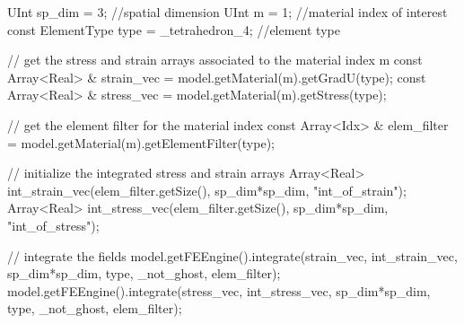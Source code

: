 \begin{cpp}
UInt sp_dim = 3; //spatial dimension
UInt m = 1; //material index of interest
const ElementType type = _tetrahedron_4; //element type

// get the stress and strain arrays associated to the material index m
const Array<Real> & strain_vec = model.getMaterial(m).getGradU(type);
const Array<Real> & stress_vec = model.getMaterial(m).getStress(type);

// get the element filter for the material index
const Array<Idx> & elem_filter = model.getMaterial(m).getElementFilter(type);

// initialize the integrated stress and strain arrays
Array<Real> int_strain_vec(elem_filter.getSize(), 
                           sp_dim*sp_dim, "int_of_strain");
Array<Real> int_stress_vec(elem_filter.getSize(), 
                           sp_dim*sp_dim, "int_of_stress");

// integrate the fields      
model.getFEEngine().integrate(strain_vec, int_strain_vec, 
                              sp_dim*sp_dim, type, _not_ghost, elem_filter);
model.getFEEngine().integrate(stress_vec, int_stress_vec, 
                              sp_dim*sp_dim, type, _not_ghost, elem_filter);
\end{cpp}


